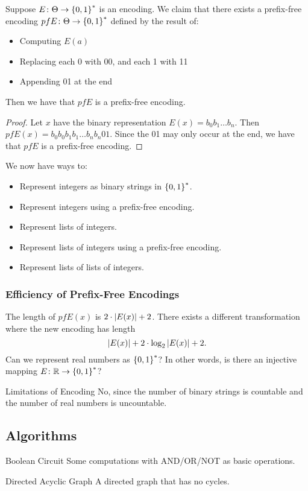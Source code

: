 \documentclass[class=article, crop=false]{standalone}
\begin{document}
  \begin{theorem}{}
    Suppose $E\colon \Theta\to \left\{0, 1\right\}^*$ is an encoding. We claim that there exists a prefix-free encoding $pfE\colon \Theta\to \left\{0, 1\right\}^*$ defined by the result of:
    \begin{itemize}
      \item Computing $E(a)$
      \item Replacing each 0 with 00, and each 1 with 11
      \item Appending 01 at the end
    \end{itemize}
    Then we have that $pfE$ is a prefix-free encoding.
  \end{theorem}
  \begin{proof}
    Let $x$ have the binary representation $E(x) = b_0b_1\dotsc b_n$. Then $pfE(x) = b_0b_0b_1b_1\dotsc b_nb_n01$. Since the 01 may only occur at the end, we have that $pfE$ is a prefix-free encoding.
  \end{proof}
  We now have ways to:
  \begin{itemize}
    \item Represent integers as binary strings in $\left\{0, 1\right\}^*$.
    \item Represent integers using a prefix-free encoding.
    \item Represent lists of integers.
    \item Represent lists of integers using a prefix-free encoding.
    \item Represent lists of lists of integers.
  \end{itemize}
  \subsubsection{Efficiency of Prefix-Free Encodings}
  The length of $pfE(x)$ is $2\cdot \left\lvert E(x) \right\rvert + 2$. There exists a different transformation where the new encoding has length
  \[
    \left\lvert E(x) \right\rvert + 2\cdot \log_2\left\lvert E(x) \right\rvert + 2.
  \]
  Can we represent real numbers as $\left\{0, 1\right\}^*$? In other words, is there an injective mapping $E\colon \mathbb{R}\to \left\{0, 1\right\}^*$? \par
  \begin{note}{Limitations of Encoding}
    No, since the number of binary strings is countable and the number of real numbers is uncountable.
  \end{note}
  \subsection{Algorithms}
  \begin{definition}{Boolean Circuit}
    Some computations with AND/OR/NOT as basic operations.
  \end{definition}
  \begin{definition}{Directed Acyclic Graph}
    A directed graph that has no cycles.
  \end{definition}
\end{document}
